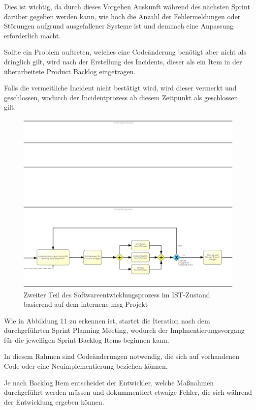 Dies ist wichtig, da durch dieses Vorgehen Auskunft während des nächsten Sprint darüber gegeben werden kann, wie hoch die Anzahl der Fehlermeldungen oder Störungen aufgrund ausgefallener Systeme ist und demnach eine Anpassung erforderlich macht. 

Sollte ein Problem auftreten, welches eine Codeänderung benötigt aber nicht als dringlich gilt, wird nach der Erstellung des Incidents, dieser als ein Item in der überarbeitete Product Backlog eingetragen. 

Falls die vermeitliche Incident nicht bestätigt wird, wird dieser vermerkt und geschlossen, wodurch der Incidentprozess ab diesem Zeitpunkt als geschlossen gilt. \\ 

\begin{figure}[h]
    \centering
    \includegraphics[scale=0.6]{Bilder/IST-Prozess_second Part.png}
    \caption{Zweiter Teil des Softwareentwicklungsprozess im IST-Zustand basierend auf dem internene msg-Projekt}
\end{figure}

Wie in Abbildung 11 zu erkennen ist, startet die Iteration nach dem durchgeführten Sprint Planning Meeting, wodurch der Implmentierungsvorgang für die jeweiligen Sprint Backlog Items beginnen kann. 

In diesem Rahmen sind Codeänderungen notwendig, die sich auf vorhandenen Code oder eine Neuimplementierung beziehen können. 

Je nach Backlog Item entscheidet der Entwickler, welche Maßnahmen durchgeführt werden müssen und dokummentiert etwaige Fehler, die sich während der Entwicklung ergeben können.  

